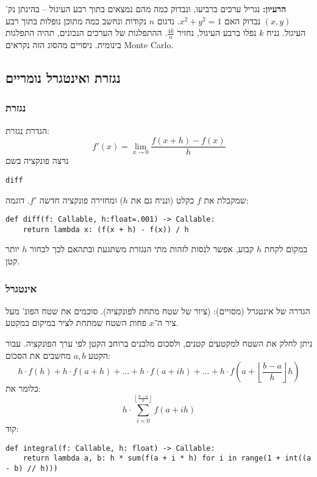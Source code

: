 \documentclass[]{article}
\newcommand\en[1] {\begin{otherlanguage}{english}#1\end{otherlanguage}}
\newcommand\sen   {\begin{otherlanguage}{english}}
\newcommand\she   {\end{otherlanguage}}
\newcommand\ttt[1]{\en{\footnotesize\texttt{#1}\normalsize}}
\newcommand\rf    {\right\rfloor}
\newcommand\lf    {\left\lfloor}
\newcommand\limh  {\lim_{x \to 0}}
\newcommand\cl [1]    {\left ( #1 \right )}
\begin{document}
	\textbf{הרעיון: }נגריל ערכים ברביעו, ונבדוק כמה מהם נמצאים בתוך רבע העיגול – 	בהינתן נק' $(x, y)$ נבדוק האם $x^{2} + y^{2} = 1$.  נדגום $n$ נקודות ונחשב כמה מתוכן נופלות בתוך רבע העיגול. נניח $k$ נפלו ברבע העיגול, נחזיר $\frac{4k}{n}$. ההתפלגות של הערכים הנכונים, תהיה התפלגות בינומית. ניסויים מהסוג הזה נקראים Monte Carlo. 
	
	\subsection{נגזרת ואינטגרל נומריים}
	\subsubsection{נגזרת}
	הגדרת נגזרת: 
	\[ f'(x) = \limh \frac{f(x + h) - f(x)}{h} \]
	נרצה פונקציה בשם \ttt{diff} שמקבלת את $f$ כקלט (ונניח גם את $h$) ומחזירה פונקציה חדשה $f'$. דוגמה: 
	\sen\begin{lstlisting}
def diff(f: Callable, h:float=.001) -> Callable: 
	return lambda x: (f(x + h) - f(x)) / h	\end{lstlisting}\she
	במקום לקחת $h$ קבוע, אפשר לנסות לזהות מתי הנגזרת משתגעת ובתהאם לכך לבחור $h$ יותר קטן. 
	\subsubsection{אינטגרל}
	הגדרה של אינטגרל (מסויים): (ציור של שטח מתחת לפונקציה). סוכמים את שטח הפונ' מעל ציר ה־$x$ פחות השטח שמתחת לציר במיקום במקטע. 
	
	ניתן לחלק את השטח למקטעים קטנים, ולסכום מלבנים ברוחב הקטן לפי ערך הפונקציה. עבור הקטע $a, b$ מחשבים את הסכום: 
	\[ h \cdot f(h) + h \cdot f(a + h) + \dots + h \cdot f(a + ih) + \dots + h \cdot f\cl{a + \lf\frac{b - a}{h}\rf h} \]
	כלומר את: 
	\[ h \cdot \sum_{i = 0}^{\lf \frac{b - a}{h} \rf}f(a + ih) \]
	קוד: 
	\sen\begin{lstlisting}
def integral(f: Callable, h: float) -> Callable: 
	return lambda a, b: h * sum(f(a + i * h) for i in range(1 + int((a - b) // h)))\end{lstlisting}\she
\end{document}
